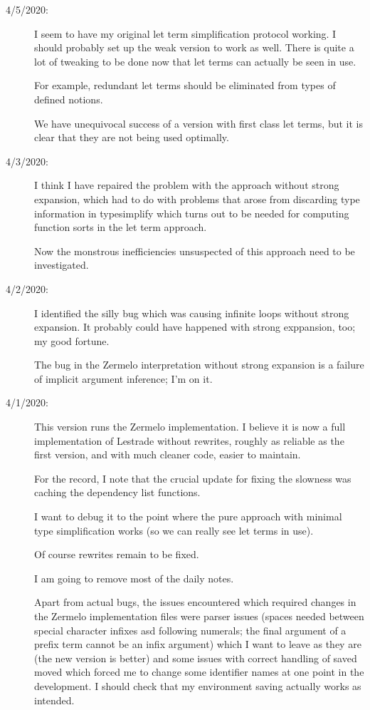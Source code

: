 \documentclass[12pt]{article}
\begin{document}
\begin{description}
\item[4/5/2020:]  I seem to have my original let term simplification protocol working.  I should probably
set up the weak version to work as well.  There is quite a lot of tweaking to be done now that let terms
can actually be seen in use.

For example, redundant let terms should be eliminated from types of defined notions.

We have unequivocal success of a version with first class let terms, but it is clear that they are not being used optimally.

\item[4/3/2020:]  I think I have repaired the problem with the approach without strong expansion,
which had to do with problems that arose from discarding type information in typesimplify which turns
out to be needed for computing function sorts in the let term approach.

Now the monstrous inefficiencies unsuspected of this approach need to be investigated.

\item[4/2/2020:]  I identified the silly bug which was causing infinite loops without strong expansion.  It probably
could have happened with strong exppansion, too;  my good fortune.

The bug in the Zermelo interpretation without strong expansion is a failure of implicit argument inference;  I'm on it.

\item[4/1/2020:]  This version runs the Zermelo implementation.  I believe it is now a full implementation of Lestrade without rewrites, roughly
as reliable as the first version, and with much cleaner code, easier to maintain.

For the record, I note that the crucial update for fixing the slowness was caching the dependency list functions.

I want to debug it to the point where the pure approach with minimal type simplification works (so we can really
see let terms in use).

Of course rewrites remain to be fixed.

I am going to remove most of the daily notes.

Apart from actual bugs, the issues encountered which required changes in the Zermelo implementation files were parser issues (spaces needed between special character infixes asd following numerals;  the final argument of a prefix term cannot be an infix argument) which I want to leave as they are (the new version is better) and some issues with
correct handling of saved moved which forced me to change some identifier names at one point in the development.  I should check that my environment saving actually works as intended.


\end{description}
\end{document}
